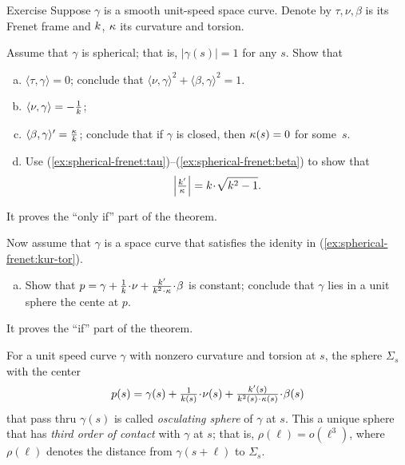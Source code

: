 \begin{thm}{Exercise}\label{ex:spherical-frenet}
Suppose $\gamma$ is a smooth unit-speed space curve.
Denote by $\tau,\nu,\beta$ 
is its Frenet frame and $k$, $\kappa$ its curvature and torsion.

\smallskip

Assume that $\gamma$ is spherical; that is, $|\gamma(s)|=1$ for any $s$.
Show that

\begin{enumerate}[(a)]
\item\label{ex:spherical-frenet:tau} $\langle\tau,\gamma\rangle=0$; conclude that $\langle\nu,\gamma\rangle^2+\langle\beta,\gamma\rangle^2=1$.
\item\label{ex:spherical-frenet:nu} $\langle\nu,\gamma\rangle=-\tfrac1{k}$;
\item\label{ex:spherical-frenet:beta} $\langle\beta,\gamma\rangle'=\tfrac{\kappa}{k}$; conclude that if $\gamma$ is closed, then $\kappa(s)=0$ for some~$s$.
\item\label{ex:spherical-frenet:kur-tor} Use (\ref{ex:spherical-frenet:tau})--(\ref{ex:spherical-frenet:beta}) to show that 
\[\left|\tfrac{\kur'}{\tor}\right|=\kur\cdot\sqrt{\kur^2-1}.\]
\setcounter{lastnumber}{\value{enumi}}
\end{enumerate}
It proves the ``only if'' part of the theorem.

\smallskip

Now assume that $\gamma$ is a space curve that satisfies the idenity in (\ref{ex:spherical-frenet:kur-tor}).
\begin{enumerate}[(a)]
\setcounter{enumi}{\value{lastnumber}}
\item Show that $p=\gamma+\tfrac1\kur\cdot \nu+\tfrac{\kur'}{\kur^2\cdot\tor}\cdot\beta$ is constant; conclude that $\gamma$ lies in a unit sphere the cente at $p$.
\end{enumerate}
It proves the ``if'' part of the theorem.
\end{thm}

For a unit speed curve $\gamma$ with nonzero curvature and torsion at $s$,
the sphere $\Sigma_s$ with the center
\[p(s)=\gamma(s)+\tfrac1{\kur(s)}\cdot \nu(s)+\tfrac{\kur'(s)}{\kur^2(s)\cdot\tor(s)}\cdot\beta(s)\]
that pass thru $\gamma(s)$ is called \emph{osculating sphere} of $\gamma$ at $s$.
This a unique sphere that has \emph{third order of contact} with $\gamma$ at $s$;
that is, $\rho(\ell)=o(\ell^3)$, where $\rho(\ell)$ denotes the distance from $\gamma(s+\ell)$ to $\Sigma_s$.
 
